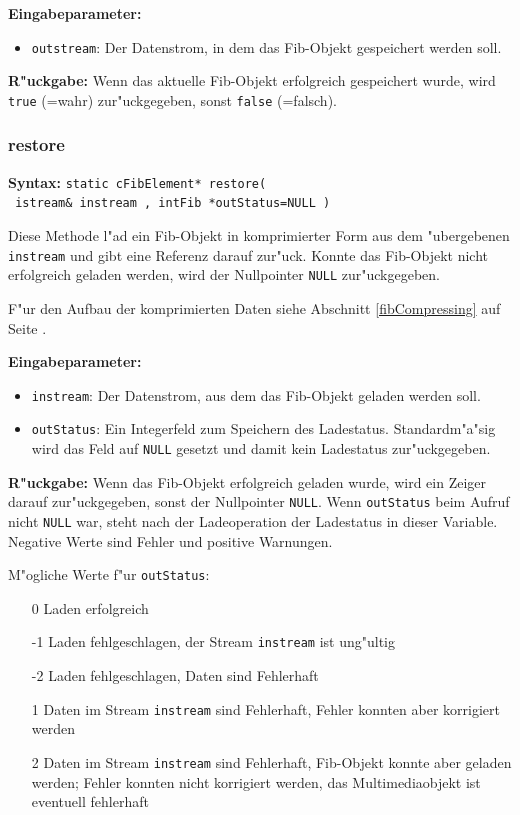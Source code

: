 \bigskip\noindent
\textbf{Eingabeparameter:}
\begin{itemize}
 \item \verb|outstream|: Der Datenstrom, in dem das Fib-Objekt gespeichert werden soll.
\end{itemize}

\bigskip\noindent
\textbf{R"uckgabe:} Wenn das aktuelle Fib-Objekt erfolgreich gespeichert wurde, wird \verb|true| (=wahr) zur"uckgegeben, sonst \verb|false| (=falsch).


\subsubsection{restore}

\textbf{Syntax:} \verb|static cFibElement* restore(| \\\verb| istream& instream , intFib *outStatus=NULL )|

\bigskip\noindent
Diese Methode l"ad ein Fib-Objekt in komprimierter Form aus dem "ubergebenen \verb|instream| und gibt eine Referenz darauf zur"uck. Konnte das Fib-Objekt nicht erfolgreich geladen werden, wird der Nullpointer \verb|NULL| zur"uckgegeben.

F"ur den Aufbau der komprimierten Daten siehe Abschnitt \ref{fibCompressing} auf Seite \pageref{fibCompressing}.

\bigskip\noindent
\textbf{Eingabeparameter:}
\begin{itemize}
 \item \verb|instream|: Der Datenstrom, aus dem das Fib-Objekt geladen werden soll.
 \item \verb|outStatus|: Ein Integerfeld zum Speichern des Ladestatus. Standardm"a"sig wird das Feld auf \verb|NULL| gesetzt und damit kein Ladestatus zur"uckgegeben.
\end{itemize}

\bigskip\noindent
\textbf{R"uckgabe:} Wenn das Fib-Objekt erfolgreich geladen wurde, wird ein Zeiger darauf zur"uckgegeben, sonst der Nullpointer \verb|NULL|. Wenn \verb|outStatus| beim Aufruf nicht \verb|NULL| war, steht nach der Ladeoperation der Ladestatus in dieser Variable. Negative Werte sind Fehler und positive Warnungen.

\bigskip\noindent
M"ogliche Werte f"ur \verb|outStatus|:
\begin{itemize}
 \item[0] Laden erfolgreich
 \item[-1] Laden fehlgeschlagen, der Stream \verb|instream| ist ung"ultig
 \item[-2] Laden fehlgeschlagen, Daten sind Fehlerhaft
 \item[1] Daten im Stream \verb|instream| sind Fehlerhaft, Fehler konnten aber korrigiert werden
 \item[2] Daten im Stream \verb|instream| sind Fehlerhaft, Fib-Objekt konnte aber geladen werden; Fehler konnten nicht korrigiert werden, das Multimediaobjekt ist eventuell fehlerhaft
\end{itemize}



